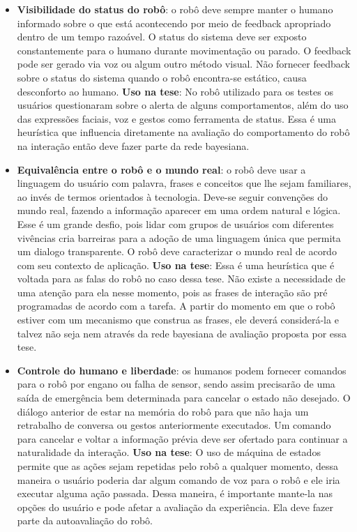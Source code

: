 \begin{itemize}
	\item \textbf{Visibilidade do status do robô}: o robô deve sempre manter o humano informado sobre o que está acontecendo por meio de feedback apropriado dentro de um tempo razoável. O status do sistema deve ser exposto constantemente para o humano durante movimentação ou parado. O feedback pode ser gerado via voz ou algum outro método visual. Não fornecer feedback sobre o status do sistema quando o robô encontra-se estático, causa desconforto ao humano. \textbf{Uso na tese}: No robô utilizado para os testes os usuários questionaram sobre o alerta de alguns comportamentos, além do uso das expressões faciais, voz e gestos como ferramenta de status. Essa é uma heurística que influencia diretamente na avaliação do comportamento do robô na interação então deve fazer parte da rede bayesiana.
	\item \textbf{Equivalência entre o robô e o mundo real}: o robô deve usar a linguagem do usuário com palavra, frases e conceitos que lhe sejam familiares, ao invés de termos orientados à tecnologia. Deve-se seguir convenções do mundo real, fazendo a informação aparecer em uma ordem natural e lógica. Esse é um grande desfio, pois lidar com grupos de usuários com diferentes vivências cria barreiras para a adoção de uma linguagem única que permita um dialogo transparente. O robô deve caracterizar o mundo real de acordo com seu contexto de aplicação. \textbf{Uso na tese}: Essa é uma heurística que é voltada para as falas do robô no caso dessa tese. Não existe a necessidade de uma atenção para ela nesse momento, pois as frases de interação são pré programadas de acordo com a tarefa. A partir do momento em que o robô estiver com um mecanismo que construa as frases, ele deverá considerá-la e talvez não seja nem através da rede bayesiana de avaliação proposta por essa tese.
	\item \textbf{Controle do humano e liberdade}: os humanos podem fornecer comandos para o robô por engano ou falha de sensor, sendo assim precisarão de uma saída de emergência bem determinada para cancelar o estado não desejado. O diálogo anterior de estar na memória do robô para que não haja um retrabalho de conversa ou gestos anteriormente executados. Um comando para cancelar e voltar a informação prévia deve ser ofertado para continuar a naturalidade da interação. \textbf{Uso na tese}: O uso de máquina de estados permite que as ações sejam repetidas pelo robô a qualquer momento, dessa maneira o usuário poderia dar algum comando de voz para o robô e ele iria executar alguma ação passada. Dessa maneira, é importante mante-la nas opções do usuário e pode afetar a avaliação da experiência. Ela deve fazer parte da autoavaliação do robô.

\end{itemize}
